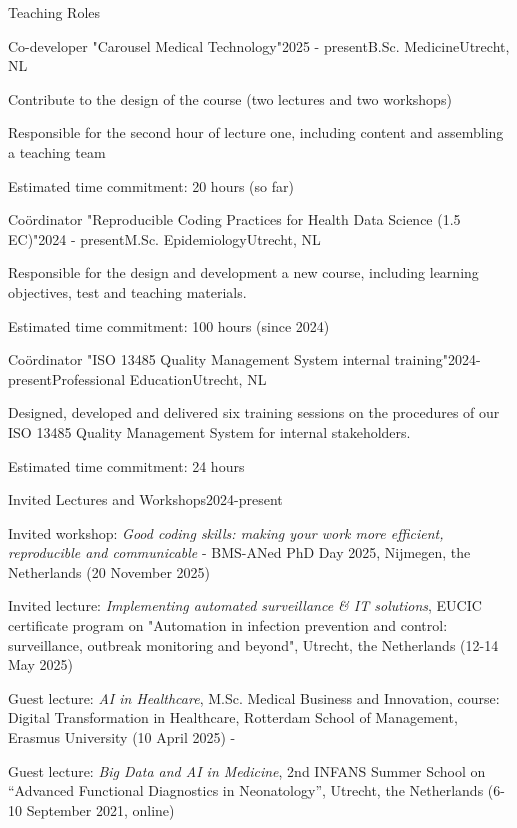 \begin{rSection}{Teaching Roles}
\begin{rSubsection}{Co-developer "Carousel Medical Technology"}{2025 - present}{B.Sc. Medicine}{Utrecht, NL}
  \vspace{-1.5em}
  \item Contribute to the design of the course (two lectures and two workshops)
  \item Responsible for the second hour of lecture one, including content and assembling a teaching team
  \item Estimated time commitment: 20 hours (so far)
\end{rSubsection}

\begin{rSubsection}{Co\"{o}rdinator "Reproducible Coding Practices for Health Data Science (1.5 EC)"}{2024 - present}{M.Sc. Epidemiology}{Utrecht, NL}
  \vspace{-1.5em}
  \item Responsible for the design and development a new course, including learning objectives, test and teaching materials.
  \item Estimated time commitment: 100 hours (since 2024)
\end{rSubsection}

\begin{rSubsection}{Co\"{o}rdinator "ISO 13485 Quality Management System internal training"}{2024-present}{Professional Education}{Utrecht, NL}
 \vspace{-1.5em}
	\item Designed, developed and delivered six training sessions on the procedures of our ISO 13485 Quality Management System for internal stakeholders.
  \item Estimated time commitment: 24 hours
\end{rSubsection}

\begin{rSubsection}{Invited Lectures and Workshops}{2024-present}{}{}
 \vspace{-1.5em}
  \item Invited workshop: \textit{Good coding skills: making your work more efficient, reproducible and communicable} - BMS-ANed PhD Day 2025, Nijmegen, the Netherlands (20 November 2025)
  \item Invited lecture: \textit{Implementing automated surveillance \& IT solutions}, EUCIC certificate program on "Automation in infection prevention and control: surveillance, outbreak monitoring and beyond", Utrecht, the Netherlands (12-14 May 2025)
  \item Guest lecture: \textit{AI in Healthcare}, M.Sc. Medical Business and Innovation, course: Digital Transformation in Healthcare, Rotterdam School of Management, Erasmus University (10 April 2025) - 
  \item Guest lecture: \textit{Big Data and AI in Medicine}, 2nd INFANS Summer School on “Advanced Functional Diagnostics in Neonatology”, Utrecht, the Netherlands (6-10 September 2021, online)
\end{rSubsection}


\end{rSection}
